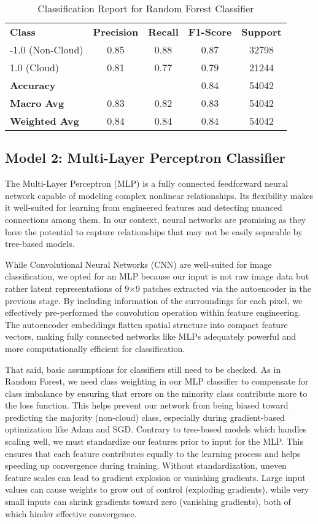 \documentclass[10pt,letterpaper]{article}
\begin{document}
\begin{table}[H]
\centering
\caption{Classification Report for Random Forest Classifier}
\begin{tabular}{lcccc}
\textbf{Class} & \textbf{Precision} & \textbf{Recall} & \textbf{F1-Score} & \textbf{Support} \\
-1.0 (Non-Cloud) & 0.85 & 0.88 & 0.87 & 32798 \\
1.0 (Cloud)      & 0.81 & 0.77 & 0.79 & 21244 \\
\textbf{Accuracy} & & & 0.84 & 54042 \\
\textbf{Macro Avg} & 0.83 & 0.82 & 0.83 & 54042 \\
\textbf{Weighted Avg} & 0.84 & 0.84  & 0.84 & 54042 \\
\end{tabular}
\end{table}

\subsection{Model 2: Multi-Layer Perceptron Classifier}
The Multi-Layer Perceptron (MLP) is a fully connected feedforward neural network capable of modeling complex nonlinear relationships. Its flexibility makes it well-suited for learning from engineered features and detecting nuanced connections among them. In our context, neural networks are promising as they have the potential to capture relationships that may not be easily separable by tree-based models.

While Convolutional Neural Networks (CNN) are well-suited for image classification, we opted for an MLP because our input is not raw image data but rather latent representations of 9×9 patches extracted via the autoencoder in the previous stage. By including information of the surroundings for each pixel, we effectively pre-performed the convolution operation within feature engineering. The autoencoder embeddings flatten spatial structure into compact feature vectors, making fully connected networks like MLPs adequately powerful and more computationally efficient for classification.

That said, basic assumptions for classifiers still need to be checked. As in Random Forest, we need class weighting in our MLP classifier to compensate for class imbalance by ensuring that errors on the minority class contribute more to the loss function. This helps prevent our network from being biased toward predicting the majority (non-cloud) class, especially during gradient-based optimization like Adam and SGD. Contrary to tree-based models which handles scaling well, we must standardize our features prior to input for the MLP. This ensures that each feature contributes equally to the learning process and helps speeding up convergence during training. Without standardization, uneven feature scales can lead to gradient explosion or vanishing gradients. Large input values can cause weights to grow out of control (exploding gradients), while very small inputs can shrink gradients toward zero (vanishing gradients), both of which hinder effective convergence.
\end{document}
